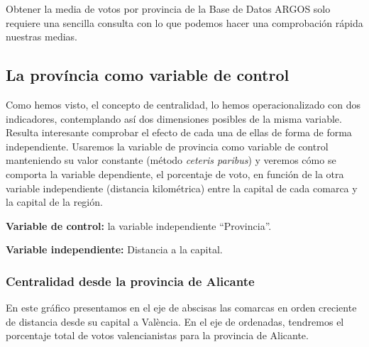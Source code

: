 \documentclass[
]{article}
\begin{document}
Obtener la media de votos por provincia de la Base de Datos ARGOS solo
requiere una sencilla consulta con lo que podemos hacer una comprobación
rápida nuestras medias.

\hypertarget{la-provuxedncia-como-variable-de-control}{%
\subsection{La província como variable de
control}\label{la-provuxedncia-como-variable-de-control}}

Como hemos visto, el concepto de centralidad, lo hemos operacionalizado
con dos indicadores, contemplando así dos dimensiones posibles de la
misma variable. Resulta interesante comprobar el efecto de cada una de
ellas de forma de forma independiente. Usaremos la variable de provincia
como variable de control manteniendo su valor constante (método
\emph{ceteris paribus}) y veremos cómo se comporta la variable
dependiente, el porcentaje de voto, en función de la otra variable
independiente (distancia kilométrica) entre la capital de cada comarca y
la capital de la región.

\textbf{Variable de control:} la variable independiente ``Provincia''.

\textbf{Variable independiente:} Distancia a la capital.

\hypertarget{centralidad-desde-la-provincia-de-alicante}{%
\subsubsection{Centralidad desde la provincia de
Alicante}\label{centralidad-desde-la-provincia-de-alicante}}

En este gráfico presentamos en el eje de abscisas las comarcas en orden
creciente de distancia desde su capital a València. En el eje de
ordenadas, tendremos el porcentaje total de votos valencianistas para la
provincia de Alicante.
\end{document}
